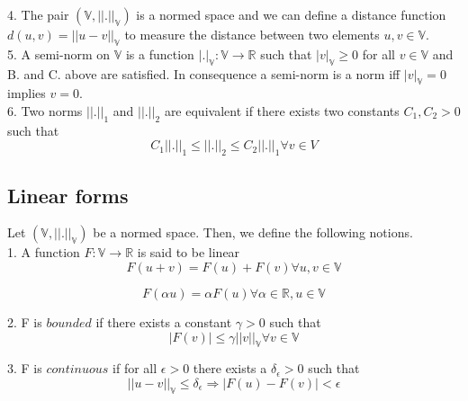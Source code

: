 \documentclass[a4paper,12pt]{book}
\begin{document}
4. The pair $(\mathbb{V},||.||_\mathbb{V})$ is a normed space and we can define a distance function $d(u,v) = ||u-v||_\mathbb{V}$ to measure the distance between two elements $u,v \in \mathbb{V}$.\\

5. A semi-norm on $\mathbb{V}$ is a function $|.|_\mathbb{V} : \mathbb{V} \rightarrow \mathbb{R}$ such that $|v|_\mathbb{V} \geq 0$ for all $v \in \mathbb{V}$ and B. and C. above are satisfied. In consequence a semi-norm is a norm iff $|v|_\mathbb{V} = 0$ implies  $v = 0$.\\

6. Two norms $||.||_1$ and $||.||_2$ are equivalent if there exists two constants $C_1,C_2 > 0$ such that \\

\begin{equation} \label{norm_equivalent}
C_1||.||_1 \leq ||.||_2 \leq C_2 ||.||_1 \forall v \in V
\end{equation}

\subsection{Linear forms}\cite{crbm}

Let $(\mathbb{V,||.||_\mathbb{V}})$ be a normed space. Then, we define the following notions.\\

1. A function $F : \mathbb{V} \rightarrow \mathbb{R}$ is said to be linear
\begin{equation} 
F(u+v) = F(u) + F(v) \forall u,v \in \mathbb{V} 
\end{equation}

\begin{equation} 
F(\alpha u) = \alpha F(u) \forall \alpha \in \mathbb{R}, u \in \mathbb{V}
\end{equation}

2. F is $bounded$ if there exists a constant $\gamma > 0$ such that
\begin{equation} 
|F(v)| \leq \gamma ||v||_\mathbb{V} \forall v \in \mathbb{V}
\end{equation}

3. F is $continuous$ if for all $\epsilon > 0$ there exists a $\delta_\epsilon > 0$ such that \\
\begin{equation}
||u - v||_\mathbb{V} \leq \delta_\epsilon \Rightarrow  |F(u) - F(v)| < \epsilon
\end{equation}
\end{document}
